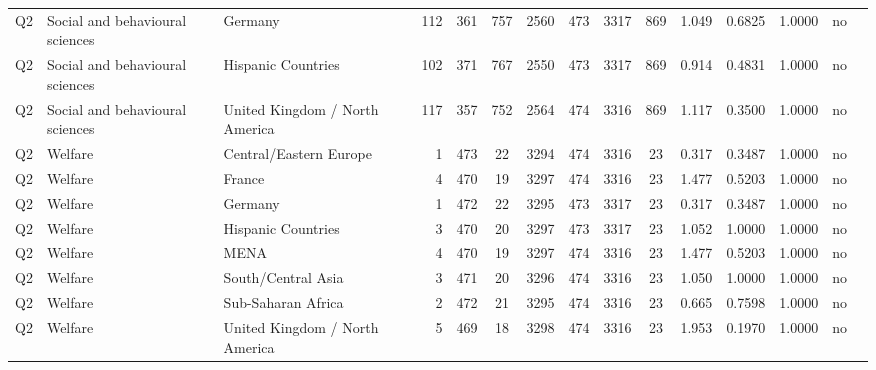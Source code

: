 \begin{longtable}{lllrcccccccccll}
Q2 & Social and behavioural sciences & Germany & 112 & 361 & 757 & 2560 & 473 & 3317 & 869 & 1.049 & 0.6825 & 1.0000 & no \\
Q2 & Social and behavioural sciences & Hispanic Countries & 102 & 371 & 767 & 2550 & 473 & 3317 & 869 & 0.914 & 0.4831 & 1.0000 & no \\
Q2 & Social and behavioural sciences & United Kingdom / North America & 117 & 357 & 752 & 2564 & 474 & 3316 & 869 & 1.117 & 0.3500 & 1.0000 & no \\
Q2 & Welfare & Central/Eastern Europe & 1 & 473 & 22 & 3294 & 474 & 3316 & 23 & 0.317 & 0.3487 & 1.0000 & no \\
Q2 & Welfare & France & 4 & 470 & 19 & 3297 & 474 & 3316 & 23 & 1.477 & 0.5203 & 1.0000 & no \\
Q2 & Welfare & Germany & 1 & 472 & 22 & 3295 & 473 & 3317 & 23 & 0.317 & 0.3487 & 1.0000 & no \\
Q2 & Welfare & Hispanic Countries & 3 & 470 & 20 & 3297 & 473 & 3317 & 23 & 1.052 & 1.0000 & 1.0000 & no \\
Q2 & Welfare & MENA & 4 & 470 & 19 & 3297 & 474 & 3316 & 23 & 1.477 & 0.5203 & 1.0000 & no \\
Q2 & Welfare & South/Central Asia & 3 & 471 & 20 & 3296 & 474 & 3316 & 23 & 1.050 & 1.0000 & 1.0000 & no \\
Q2 & Welfare & Sub-Saharan Africa & 2 & 472 & 21 & 3295 & 474 & 3316 & 23 & 0.665 & 0.7598 & 1.0000 & no \\
Q2 & Welfare & United Kingdom / North America & 5 & 469 & 18 & 3298 & 474 & 3316 & 23 & 1.953 & 0.1970 & 1.0000 & no \\
\end{longtable}
